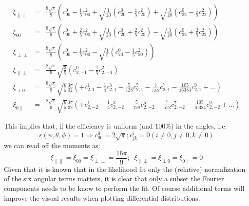 \documentclass[a4paper,9pt,twoside]{article}
\begin{document}
\begin{eqnarray}
    \xi_{\parallel\parallel} &=& \frac{8 \sqrt{\pi}}{9} \left( c^0_{00}-\frac{1}{5}c^2_{00}+\sqrt{\frac{1}{20}}\left(c^0_{20}-\frac{1}{5}c^2_{20}\right)+\sqrt{\frac{3}{20}}\left(c^0_{22}-\frac{1}{5}c^2_{22}\right)  \right)  \\
    \xi_{00}                 &=& \frac{8 \sqrt{\pi}}{9} \left( c^0_{00}+\frac{2}{5}c^2_{00}+\sqrt{\frac{1}{20}}(c^0_{20}+\frac{2}{5}c^2_{20})-\sqrt{\frac{3}{20}}(c^0_{22}+\frac{2}{5}c^2_{22}) \right) \\
    \xi_{\perp\perp}         &=& \frac{8 \sqrt{\pi}}{9} \left( c^0_{00}-\frac{1}{5}c^2_{00} - \sqrt{\frac{1}{5}}\left(c^0_{20}-\frac{1}{5}c^2_{20}\right)\right)\\
    \xi_{\parallel\perp}     &=& \frac{8 \sqrt{\pi}}{9} \sqrt{\frac{3}{5}}\left(c^0_{2,-1}-\frac{1}{5}c^2_{2,-1}\right)  \\
    \xi_{\perp 0}            &=& \frac{8 \sqrt{\pi}}{9} \sqrt{\frac{6}{5}}\frac{3\pi}{32}\left( +c^1_{2,1} -\frac{1}{4}c^3_{2,1}- \frac{5}{128}c^5_{2,1} -\frac{7}{512}c^7_{2,1} - \frac{105}{16384}c^9_{2,1}+... \right) \\
    \xi_{0\parallel}         &=& \frac{8 \sqrt{\pi}}{9} \sqrt{\frac{6}{5}}\frac{3\pi}{32}\left( +c^1_{2,-2}-\frac{1}{4}c^3_{2,-2}-\frac{5}{128}c^5_{2,-2}-\frac{7}{512}c^7_{2,-2} - \frac{105}{16384}c^9_{2,-2}+... \right) 
\end{eqnarray}

This implies that, if the efficiency is uniform (and $100\%$) in the angles, i.e.
\begin{equation}
   \epsilon(\psi,\theta,\phi) = 1 \Rightarrow c^0_{00} = 2\sqrt{\pi} ; c^{i}_{jk} = 0 (i\neq 0, j\neq 0, k \neq 0)
\end{equation}
we can read off the moments as:
\begin{equation}
    \xi_{\parallel\parallel}= \xi_{00}= \xi_{\perp\perp}  = \frac{16\pi}{9};\;\; \xi_{\parallel\perp} =\xi_{\perp 0} = \xi_{0\parallel} = 0
\end{equation}
Given that it is known that  in the likelihood fit only the (relative) normalization of the six angular
terms matters, it is clear that only a subset the Fourier components needs to be know to
perform the fit. Of course additional terms will improve the visual results when plotting 
differential distributions.



\end{document}
